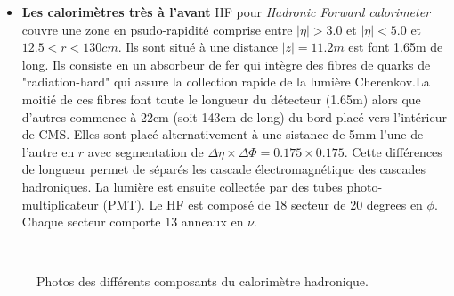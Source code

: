 \begin{itemize}[label=$\bullet$]
	\item \textbf{Les calorimètres très à l'avant} HF pour \textit{Hadronic Forward calorimeter} couvre une zone en psudo-rapidité comprise entre $|\eta|>3.0$ et $|\eta|<5.0$ et $12.5<r<130cm$. Ils sont situé à une distance $|z|=11.2m$ est font 1.65m de long. Ils consiste en un absorbeur de fer qui intègre des fibres de quarks de "radiation-hard" qui assure la collection rapide de la lumière Cherenkov.La moitié de ces fibres font toute le longueur du détecteur (1.65m) alors que d'autres commence à 22cm (soit 143cm de long) du bord placé vers l'intérieur de CMS. Elles sont placé alternativement à une sistance de 5mm l'une de l'autre en $r$  avec segmentation de $\Delta\eta\times\Delta\Phi=0.175\times0.175$. Cette différences de longueur permet de séparés les cascade électromagnétique des cascades hadroniques. La lumière est ensuite collectée par des tubes photo-multiplicateur (PMT). Le HF est composé de 18 secteur de 20 degrees en $\phi$. Chaque secteur comporte 13 anneaux en $\nu$.
\end{itemize}
\begin{figure}[ht!]
\centering
{}
\\
\caption{Photos des différents composants du calorimètre hadronique.}
\end{figure}	
